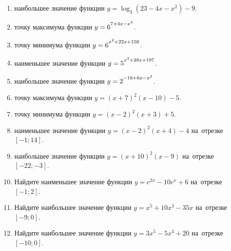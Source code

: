 \documentclass[a4paper,10pt]{article}
\begin{document}
\begin{enumerate}
\item {} наибольшее значение функции $y=\log_3\left(23-4x-x^2\right)-9$.

\item {} точку максимума функции $y=6\strut^{7+4x-x^2}$.

\item {} точку минимума функции $y=6\strut^{x^2+22x+150}$.

\item {} наименьшее значение функции $y=5\strut^{x^2+28x+197}$.

\item {} наибольшее значение функции $y=2\strut^{-18+8x-x^2}$.

\item {} точку максимума функции $y=\left(x+7\right)^2\left(x-10\right)-5$.

\item {} точку минимума функции $y=\left(x-2\right)^2\left(x+3\right)+5$.

\item {} наименьшее значение функции $y=\left(x-2\right)^2\left(x+4\right)-4$ на~отрезке~$\left[-1;14\right]$.

\item {} наибольшее значение функции $y=\left(x+10\right)^2\left(x-9\right)$ на~отрезке~$\left[-22;-3\right]$.

\item Найдите наименьшее значение функции $y=e^{2x}-10e^x+6$ на~отрезке~$\left[-1;2\right]$.

\item Найдите наибольшее значение функции $y=x^5+10x^3-35x$ на~отрезке~$\left[-9;0\right]$.

\item Найдите наибольшее значение функции $y=3x^5-5x^3+20$ на~отрезке~$\left[-10;0\right]$.

\end{enumerate}
\end{document}
